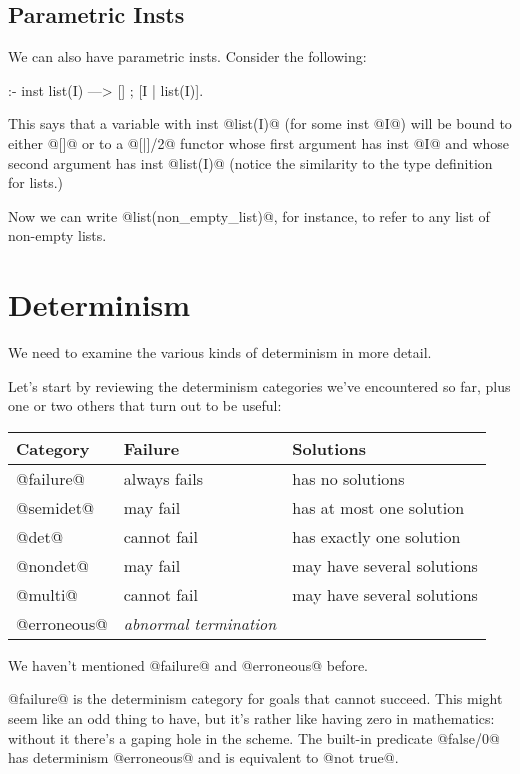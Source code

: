 \subsection{Parametric Insts}

We can also have parametric insts.  Consider the following:
\begin{myverbatim}
:- inst list(I) ---> [] ; [I | list(I)].
\end{myverbatim}
This says that a variable with inst @list(I)@ (for some inst @I@) will
be bound to either @[]@ or to a @[|]/2@ functor whose first argument has
inst @I@ and whose second argument has inst @list(I)@ (notice the
similarity to the type definition for lists.)

Now we can write @list(non_empty_list)@, for instance, to refer to any
list of non-empty lists.

\section{Determinism}

We need to examine the various kinds of determinism in more detail.

Let's start by reviewing the determinism categories we've encountered so
far, plus one or two others that turn out to be useful:

\begin{tabular}{l|l|l}
Category    & Failure       & Solutions \\
\hline \hline
@failure@   & always fails  & has no solutions \\
@semidet@   & may fail      & has at most one solution \\
@det@       & cannot fail   & has exactly one solution \\
@nondet@    & may fail      & may have several solutions \\
@multi@     & cannot fail   & may have several solutions \\
@erroneous@ & \emph{abnormal termination} \\
\end{tabular}

We haven't mentioned @failure@ and @erroneous@ before.

@failure@ is the determinism category for goals that cannot succeed.
This might seem like an odd thing to have, but it's rather like having
zero in mathematics: without it there's a gaping hole in the scheme.
The built-in predicate @false/0@ has determinism @erroneous@ and is
equivalent to @not true@.

